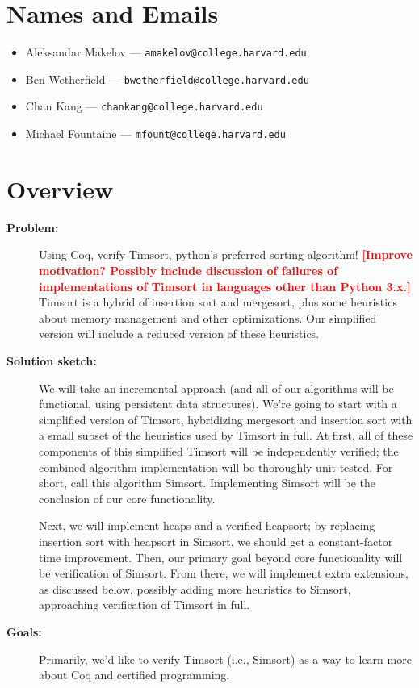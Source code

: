 \documentclass{article}
\newcommand{\todo}[1]{\textcolor{red}{\textbf{\textsf{[#1]}}}}
\begin{document}
\section{Names and Emails}
\begin{itemize}
  \item Aleksandar Makelov --- \texttt{amakelov@college.harvard.edu}
  \item Ben Wetherfield --- \texttt{bwetherfield@college.harvard.edu}
  \item Chan Kang --- \texttt{chankang@college.harvard.edu}
  \item Michael Fountaine --- \texttt{mfount@college.harvard.edu}
\end{itemize}


\section{Overview}
\begin{description}
  \item[\textbf{Problem:}]
    Using Coq, verify Timsort, python's preferred sorting algorithm!
    \todo{Improve motivation? Possibly include discussion of failures of
    implementations of Timsort in languages other than Python 3.x.}
    Timsort is a hybrid of insertion sort and mergesort, plus some heuristics
    about memory management and other optimizations.
    Our simplified version will include a reduced version of these
    heuristics.

  \item[\textbf{Solution sketch:}]
    We will take an incremental approach (and all of our algorithms
    will be functional, using persistent data structures).
    We're going to start with a
    simplified version of Timsort,
    hybridizing mergesort and insertion sort
    with a small subset of the heuristics used by Timsort in full.
    At first, all of these components of this simplified Timsort will
    be independently verified; the combined algorithm implementation
    will be thoroughly unit-tested.
    For short, call this algorithm Simsort.
    Implementing Simsort will be the conclusion of our core functionality.

    Next, we will implement heaps and a verified heapsort;
    by replacing insertion sort with heapsort in Simsort,
    we should get a constant-factor time improvement.
    Then, our primary goal beyond core functionality will
    be verification of Simsort.
    From there, we will implement extra extensions, as discussed below,
    possibly adding more heuristics to Simsort, approaching verification
    of Timsort in full.

  \item[\textbf{Goals:}]
    Primarily, we'd like to verify Timsort (i.e., Simsort) as a way to
    learn more about Coq and certified programming.

\end{description}
\end{document}
